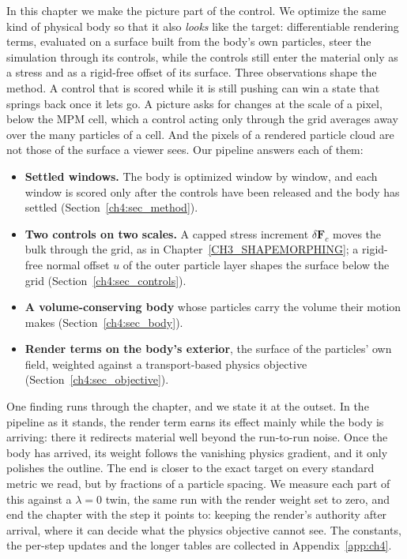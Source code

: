 In this chapter we make the picture part of the control. We optimize the same kind of physical body so that it also
\emph{looks} like the target: differentiable rendering terms, evaluated on a surface built from the body's own particles,
steer the simulation through its controls, while the controls still enter the material only as a stress and as a
rigid-free offset of its surface. Three observations shape the method. A control that is scored while it is still pushing
can win a state that springs back once it lets go. A picture asks for changes at the scale of a pixel, below the MPM
cell, which a control acting only through the grid averages away over the many particles of a cell. And the pixels of a
rendered particle cloud are not those of the surface a viewer sees. Our pipeline answers each of them:
\begin{itemize}
  \item \textbf{Settled windows.} The body is optimized window by window, and each window is scored only after the
        controls have been released and the body has settled (Section~\ref{ch4:sec_method}).
  \item \textbf{Two controls on two scales.} A capped stress increment $\delta\mathbf{F}_c$ moves the bulk through the
        grid, as in Chapter~\ref{CH3_SHAPEMORPHING}; a rigid-free normal offset $u$ of the outer particle layer shapes the
        surface below the grid (Section~\ref{ch4:sec_controls}).
  \item \textbf{A volume-conserving body} whose particles carry the volume their motion makes
        (Section~\ref{ch4:sec_body}).
  \item \textbf{Render terms on the body's exterior}, the surface of the particles' own field, weighted against a
        transport-based physics objective (Section~\ref{ch4:sec_objective}).
\end{itemize}

One finding runs through the chapter, and we state it at the outset. In the pipeline as it stands, the render term earns
its effect mainly while the body is arriving: there it redirects material well beyond the run-to-run noise. Once the body
has arrived, its weight follows the vanishing physics gradient, and it only polishes the outline. The end is closer to the
exact target on every standard metric we read, but by fractions of a particle spacing. We measure each part of this
against a $\lambda=0$ twin, the same run with the render weight set to zero, and end the chapter with the step it points
to: keeping the render's authority after arrival, where it can decide what the physics objective cannot see. The
constants, the per-step updates and the longer tables are collected in Appendix~\ref{app:ch4}.

